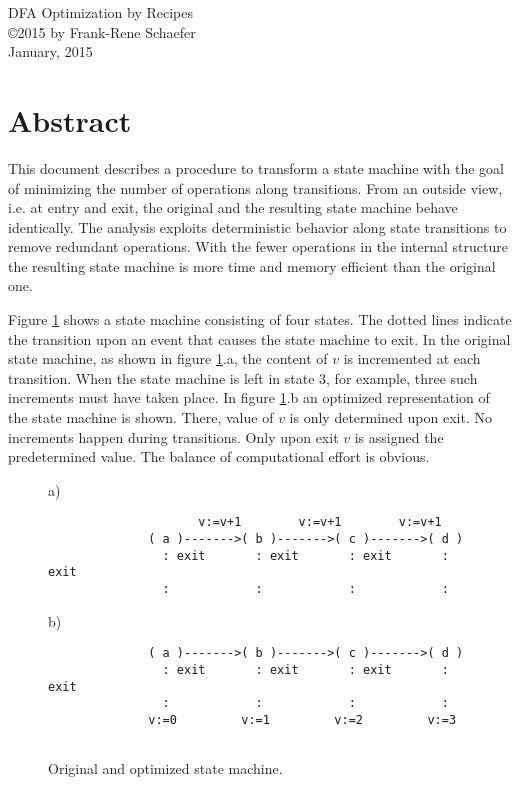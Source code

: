 \documentclass[12pt,a4paper]{scrartcl}
\begin{document}
\begin{center}
{\large DFA Optimization by Recipes} \\ 
\copyright 2015 by Frank-Rene Schaefer         \\
January, 2015
\end{center}


%
\section{Abstract}

This document describes a procedure to transform a state machine with the goal
of minimizing the number of operations along transitions.  From an outside
view, i.e. at entry and exit, the original and the resulting state machine
behave identically.  The analysis exploits deterministic behavior along state
transitions to remove redundant operations.  With the fewer operations in the
internal structure the resulting state machine is more time and memory efficient
than the original one.  

Figure \ref{fig:two-state-machines} shows a state machine consisting of four
states.  The dotted lines indicate the transition upon an event that causes the
state machine to exit.  In the original state machine, as shown in figure
\ref{fig:two-state-machines}.a, the content of $v$ is incremented at each
transition. When the state machine is left in state 3, for example, three such
increments must have taken place. In figure \ref{fig:two-state-machines}.b an
optimized representation of the state machine is shown.  There, value of $v$ is
only determined upon exit.  No increments happen during transitions. Only upon
exit $v$ is assigned the predetermined value. The balance of computational
effort is obvious.

\begin{figure}[htbp] \leavevmode \label{fig:two-state-machines}
a)
\begin{verbatim}
                     v:=v+1        v:=v+1        v:=v+1
              ( a )------->( b )------->( c )------->( d )
                : exit       : exit       : exit       : exit
                :            :            :            :
\end{verbatim}
    
b)
\begin{verbatim}
              ( a )------->( b )------->( c )------->( d )
                : exit       : exit       : exit       : exit
                :            :            :            :
              v:=0         v:=1         v:=2         v:=3
    
\end{verbatim}
\caption{Original and optimized state machine.}
\end{figure}
                 
\end{document}
